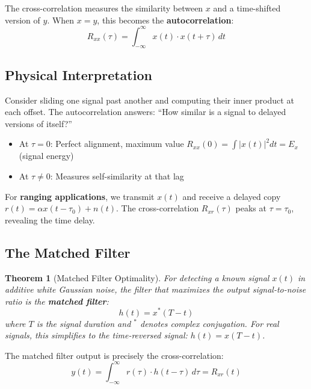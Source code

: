 \documentclass[11pt]{article}
\newtheorem{theorem}{Theorem}
\begin{document}
The cross-correlation measures the similarity between $x$ and a time-shifted version of $y$. When $x = y$, this becomes the \textbf{autocorrelation}:
\begin{equation}
R_{xx}(\tau) = \int_{-\infty}^{\infty} x(t) \cdot x(t + \tau) \, dt
\end{equation}

\subsection{Physical Interpretation}

Consider sliding one signal past another and computing their inner product at each offset. The autocorrelation answers: ``How similar is a signal to delayed versions of itself?''

\begin{itemize}
    \item At $\tau = 0$: Perfect alignment, maximum value $R_{xx}(0) = \int |x(t)|^2 dt = E_x$ (signal energy)
    \item At $\tau \neq 0$: Measures self-similarity at that lag
\end{itemize}

For \textbf{ranging applications}, we transmit $x(t)$ and receive a delayed copy $r(t) = \alpha x(t - \tau_0) + n(t)$. The cross-correlation $R_{xr}(\tau)$ peaks at $\tau = \tau_0$, revealing the time delay.

\subsection{The Matched Filter}

\begin{theorem}[Matched Filter Optimality]
For detecting a known signal $x(t)$ in additive white Gaussian noise, the filter that maximizes the output signal-to-noise ratio is the \textbf{matched filter}:
\begin{equation}
h(t) = x^*(T - t)
\end{equation}
where $T$ is the signal duration and $^*$ denotes complex conjugation. For real signals, this simplifies to the time-reversed signal: $h(t) = x(T - t)$.
\end{theorem}

The matched filter output is precisely the cross-correlation:
\begin{equation}
y(t) = \int_{-\infty}^{\infty} r(\tau) \cdot h(t - \tau) \, d\tau = R_{xr}(t)
\end{equation}
\end{document}

